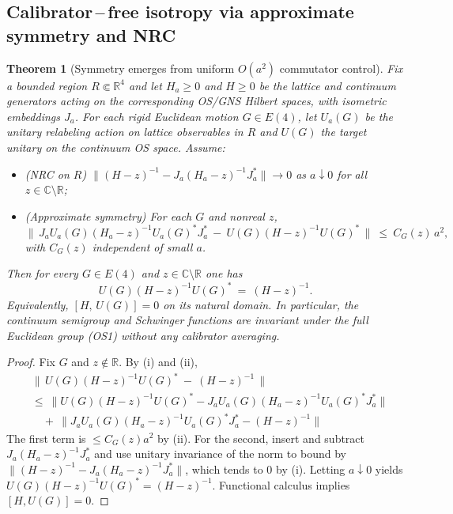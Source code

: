 \documentclass[11pt]{amsart}
\theoremstyle{plain}
\newtheorem{theorem}{Theorem}[section]
\theoremstyle{definition}
\theoremstyle{remark}
\begin{document}
\medskip

\subsection*{Calibrator\,--\,free isotropy via approximate symmetry and NRC}

\begin{theorem}[Symmetry emerges from uniform $O(a^2)$ commutator control]\label{thm:emergent-sym}
Fix a bounded region $R\Subset \mathbb R^4$ and let $H_a\ge 0$ and $H\ge 0$ be the lattice and continuum generators acting on the corresponding OS/GNS Hilbert spaces, with isometric embeddings $J_a$. For each rigid Euclidean motion $G\in E(4)$, let $U_a(G)$ be the unitary relabeling action on lattice observables in $R$ and $U(G)$ the target unitary on the continuum OS space. Assume:
\begin{itemize}
  \item[(i)] (NRC on $R$) $\|(H-z)^{-1}-J_a(H_a-z)^{-1}J_a^*\|\to 0$ as $a\downarrow 0$ for all $z\in\mathbb C\setminus\mathbb R$;
  \item[(ii)] (Approximate symmetry) For each $G$ and nonreal $z$,
  \[
    \big\|\,J_a U_a(G)(H_a-z)^{-1} U_a(G)^* J_a^*\ -\ U(G)(H-z)^{-1}U(G)^*\,\big\|\ \le\ C_G(z)\,a^2,
  \]
  with $C_G(z)$ independent of small $a$.
\end{itemize}
Then for every $G\in E(4)$ and $z\in\mathbb C\setminus\mathbb R$ one has
\[
  U(G)(H-z)^{-1}U(G)^*\ =\ (H-z)^{-1}.
\]
Equivalently, $[H,\,U(G)]=0$ on its natural domain. In particular, the continuum semigroup and Schwinger functions are invariant under the full Euclidean group (OS1) without any calibrator averaging.
\end{theorem}

\begin{proof}
Fix $G$ and $z\notin\mathbb R$. By (i) and (ii),
\[
\begin{aligned}
  &\big\|\,U(G)(H-z)^{-1}U(G)^*\ -\ (H-z)^{-1}\,\big\| \\
  &\le\ \big\|U(G)(H-z)^{-1}U(G)^* - J_a U_a(G)(H_a-z)^{-1}U_a(G)^* J_a^*\big\| \\
  &\quad +\ \big\|J_a U_a(G)(H_a-z)^{-1}U_a(G)^* J_a^* - (H-z)^{-1}\big\|
  
\end{aligned}
\]
The first term is $\le C_G(z) a^2$ by (ii). For the second, insert and subtract $J_a(H_a-z)^{-1}J_a^*$ and use unitary invariance of the norm to bound by $\|(H-z)^{-1}-J_a(H_a-z)^{-1}J_a^*\|$, which tends to $0$ by (i). Letting $a\downarrow 0$ yields $U(G)(H-z)^{-1}U(G)^*=(H-z)^{-1}$. Functional calculus implies $[H,U(G)]=0$.
\end{proof}
\end{document}
